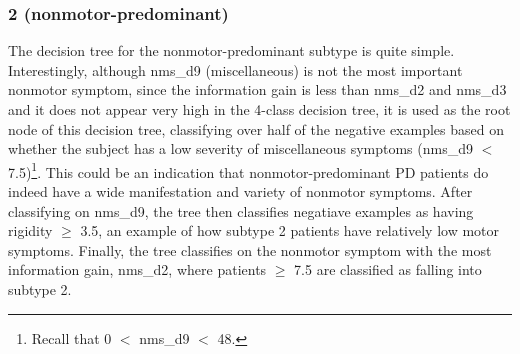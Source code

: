 \documentclass[10pt]{article}
\begin{document}
\begin{multicols}{2}
\subsubsection{2 (nonmotor-predominant)}
The decision tree for the nonmotor-predominant subtype is quite simple.
Interestingly, although nms\_d9 (miscellaneous) is not the most important
nonmotor symptom, since the information gain is less than nms\_d2 and nms\_d3
and it does not appear very high in the 4-class decision tree, it is used as
the root node of this decision tree, classifying over half of the negative
examples based on whether the subject has a low severity of miscellaneous
symptoms (nms\_d9 $<$ 7.5)\footnote{Recall that 0 $<$ nms\_d9 $<$ 48.}. This could be an indication that nonmotor-predominant PD patients do
indeed have a wide manifestation and variety of nonmotor symptoms. After
classifying on nms\_d9, the tree then classifies negatiave examples as having
rigidity $\geq$ 3.5, an example of how subtype 2 patients have relatively low motor
symptoms. Finally, the tree classifies on the nonmotor symptom with the most
information gain, nms\_d2, where patients $\geq$ 7.5 are classified as falling into
subtype 2.




\end{multicols}
\end{document}
